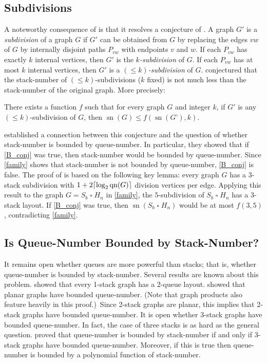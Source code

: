 \documentclass[kpfonts]{patmorin}
\DeclareMathOperator{\sn}{sn}
\DeclareMathOperator{\qn}{qn}
\renewcommand{\leq}{\leqslant}
\newcommand{\CartProd}{\mathbin{\square}}
\begin{document}
\subsection*{Subdivisions}

A noteworthy consequence of  is that it resolves a conjecture of \citet{BO99}. A graph $G'$ is a \textit{subdivision} of a graph $G$ if $G'$ can be obtained from $G$ by replacing the edges $vw$ of $G$ by internally disjoint paths $P_{vw}$ with endpoints $v$ and $w$. If each $P_{vw}$ has exactly $k$ internal vertices, then $G'$ is the \emph{$k$-subdivision} of $G$. If each $P_{vw}$ has at most $k$ internal vertices, then $G'$ is a \emph{$(\leq k)$-subdivision} of $G$. \citet{BO99} conjectured that the stack-number of $(\leq k)$-subdivisions ($k$ fixed)  is not much less than the stack-number of the original graph. More precisely:

\begin{conj}[\citep{BO99}]
\label{B_conj}
There exists a function $f$ such that for every graph $G$ and integer $k$, if $G'$ is any $(\leq k)$-subdivision of $G$, then $\sn(G) \leq f(\sn(G’),k)$.
\end{conj}

\citet{DujWoo05} established a connection between this conjecture and the question of whether stack-number is bounded by queue-number. In particular, they showed that if
\cref{B_conj} was true, then stack-number would be bounded by queue-number. Since \cref{family} shows that stack-number is not bounded by queue-number, \cref{B_conj} is false. The proof of \citet{DujWoo05} is based on the following key lemma: every graph $G$ has a $3$-stack subdivision with $1+2 \ceil{\log_2\qn(G)}$ division vertices per edge. Applying this result to the graph $G=S_b\CartProd H_n$ in \cref{family},
the $5$-subdivision of $S_b\CartProd H_n$ has a $3$-stack layout. If \cref{B_conj} was true, then  $\sn(S_b\CartProd H_n)$ would be at most $f( 3,5)$, contradicting \cref{family}.


\subsection*{Is Queue-Number Bounded by Stack-Number? }

It remains open whether queues are more powerful than stacks; that is, whether queue-number is bounded by stack-number. Several results are known about this problem. \citet{HLR92} showed that every 1-stack graph has a 2-queue layout. \citet{DJMMUW20} showed that planar graphs have bounded queue-number. (Note that graph products also feature heavily in this proof.)\ Since 2-stack graphs are planar, this implies that 2-stack graphs have bounded queue-number. It is open whether 3-stack graphs have bounded queue-number. In fact, the case of three stacks is as hard as the general question. \citet{DujWoo05} proved that queue-number is bounded by stack-number if and only if 3-stack graphs have bounded queue-number. Moreover, if this is true then queue-number is bounded by a polynomial function of stack-number.
\end{document}
